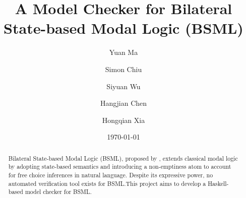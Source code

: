 \documentclass[12pt,a4paper]{article}
\title{A Model Checker for Bilateral State-based Modal Logic (BSML)}
\author{Yuan Ma \and Simon Chiu \and Siyuan Wu \and Hangjian Chen \and Hongqian Xia}
\date{\today}
\begin{document}
\maketitle

\begin{abstract}

    Bilateral State-based Modal Logic (BSML), proposed by \citet{Aloni2024}, extends classical modal logic by adopting state-based semantics and introducing a non-emptiness atom to account for free choice inferences in natural language. Despite its expressive power, no automated verification tool exists for BSML.\@ This project aims to develop a Haskell-based model checker for BSML.\@ 

\end{abstract}


\tableofcontents

\clearpage





















\end{document}
